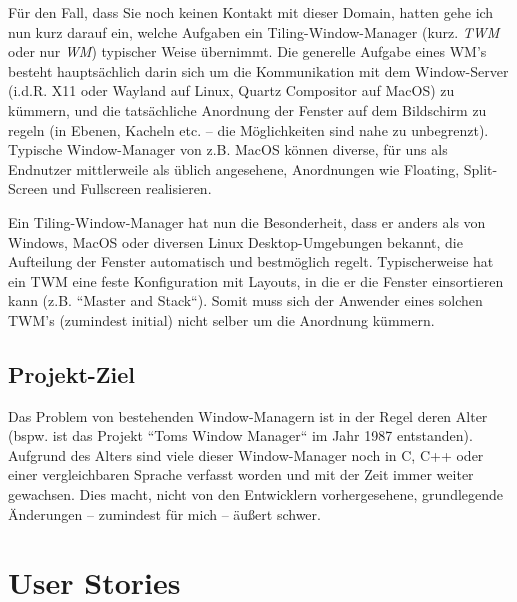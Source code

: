 \documentclass{article}
\begin{document}
Für den Fall, dass Sie noch keinen Kontakt mit dieser Domain, hatten gehe ich nun kurz darauf ein,
welche Aufgaben ein Tiling-Window-Manager (kurz. \emph{TWM} oder nur \emph{WM}) typischer Weise übernimmt.
Die generelle Aufgabe eines WM's besteht hauptsächlich darin sich um die Kommunikation mit dem
Window-Server (i.d.R. X11 oder Wayland auf Linux, Quartz Compositor auf MacOS) zu kümmern, und die
tatsächliche Anordnung der Fenster auf dem Bildschirm zu regeln (in Ebenen, Kacheln etc. – die Möglichkeiten
sind nahe zu unbegrenzt). Typische Window-Manager von z.B. MacOS können diverse, für uns als Endnutzer
mittlerweile als üblich angesehene, Anordnungen wie Floating, Split-Screen und Fullscreen realisieren. \par
Ein Tiling-Window-Manager hat nun die Besonderheit, dass er anders als von Windows, MacOS oder diversen Linux
Desktop-Umgebungen bekannt, die Aufteilung der Fenster automatisch und bestmöglich regelt. Typischerweise
hat ein TWM eine feste Konfiguration mit Layouts, in die er die Fenster einsortieren kann (z.B. ``Master
and Stack``). Somit muss sich der Anwender eines solchen TWM's (zumindest initial) nicht selber um die
Anordnung kümmern.

\subsection{Projekt-Ziel}

Das Problem von bestehenden Window-Managern ist in der Regel deren Alter (bspw. ist das Projekt ``Toms
Window Manager`` im Jahr 1987 entstanden). Aufgrund des Alters sind viele dieser Window-Manager noch in
C, C++ oder einer vergleichbaren Sprache verfasst worden und mit der Zeit immer weiter gewachsen. Dies
macht, nicht von den Entwicklern vorhergesehene, grundlegende Änderungen – zumindest für mich – äußert
schwer.



\section{User Stories}
\end{document}
